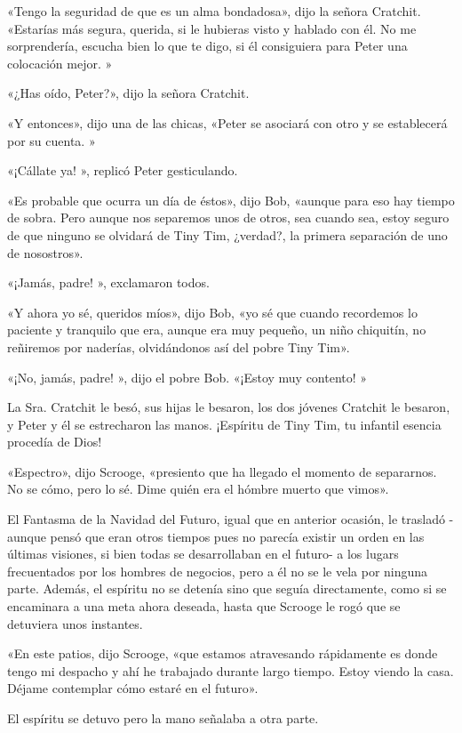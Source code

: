 \documentclass{novela}
\begin{document}
 «Tengo la seguridad de que es un alma bondadosa», dijo la señora Cratchit. «Estarías más segura, querida, si le hubieras visto y hablado con él. No me sorprendería, escucha bien lo que te digo, si él consiguiera para Peter una colocación mejor. »

 «¿Has oído, Peter?», dijo la señora Cratchit.

 «Y entonces», dijo una de las chicas, «Peter se asociará con otro y se establecerá por su cuenta. »

 «¡Cállate ya! », replicó Peter gesticulando.

 «Es probable que ocurra un día de éstos», dijo Bob, «aunque para eso hay tiempo de sobra. Pero aunque nos separemos unos de otros, sea cuando sea, estoy seguro de que ninguno se olvidará de Tiny Tim, ¿verdad?, la primera separación de uno de nosostros».

 «¡Jamás, padre! », exclamaron todos.

 «Y ahora yo sé, queridos míos», dijo Bob, «yo sé que cuando recordemos lo paciente y tranquilo que era, aunque era muy pequeño, un niño chiquitín, no reñiremos por naderías, olvidándonos así del pobre Tiny Tim».

 «¡No, jamás, padre! », dijo el pobre Bob. «¡Estoy muy contento! »

 La Sra. Cratchit le besó, sus hijas le besaron, los dos jóvenes Cratchit le besaron, y Peter y él se estrecharon las manos. ¡Espíritu de Tiny Tim, tu infantil esencia procedía de Dios!

 «Espectro», dijo Scrooge, «presiento que ha llegado el momento de separarnos. No se cómo, pero lo sé. Dime quién era el hómbre muerto que vimos».

 El Fantasma de la Navidad del Futuro, igual que en anterior ocasión, le trasladó -aunque pensó que eran otros tiempos pues no parecía existir un orden en las últimas visiones, si bien todas se desarrollaban en el futuro- a los lugars frecuentados por los hombres de negocios, pero a él no se le vela por ninguna parte. Además, el espíritu no se detenía sino que seguía directamente, como si se encaminara a una meta ahora deseada, hasta que Scrooge le rogó que se detuviera unos instantes.

 «En este patios, dijo Scrooge, «que estamos atravesando rápidamente es donde tengo mi despacho y ahí he trabajado durante largo tiempo. Estoy viendo la casa. Déjame contemplar cómo estaré en el futuro».

 El espíritu se detuvo pero la mano señalaba a otra parte.
\end{document}

